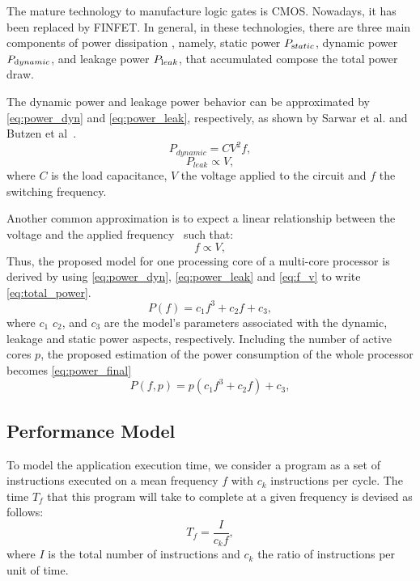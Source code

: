 \documentclass{ieeeaccess}
\begin{document}
The mature technology to manufacture logic gates is CMOS. Nowadays, it has been replaced by FINFET. In general, in these technologies, there are three main components of power dissipation \cite{Rauber2014, Goel2016, Du2017, Gonzalez1997},  namely, static power $P_{\rm static}$, dynamic power $P_{\rm dynamic}$, and leakage power $P_{\rm leak}$, that accumulated compose the total power draw.

The dynamic power and leakage power behavior can be approximated by \cref{eq:power_dyn} and \cref{eq:power_leak}, respectively, as shown by Sarwar et al. and Butzen et al~\cite{Sarwar1997, Butzen2007}.
\begin{equation}
P_{dynamic}=CV^2f,
\label{eq:power_dyn}
\end{equation}
\begin{equation}
P_{leak} \propto V,
\label{eq:power_leak}
\end{equation}
where $C$ is the load capacitance, $V$ the voltage applied to the circuit and $f$ the switching frequency.

Another common approximation is to expect a linear relationship between the voltage and the applied frequency~\cite{Usman2013ANoC} such that:
\begin{equation}
f \propto V,
\label{eq:f_v}
\end{equation}
Thus, the proposed model for one processing core of a multi-core processor is derived by using \cref{eq:power_dyn}, \cref{eq:power_leak} and \cref{eq:f_v} to write \cref{eq:total_power}.
\begin{equation}
P(f)= c_1f^3+c_2f+c_3,
\label{eq:total_power}
\end{equation}
where $c_1$ $c_2$, and $c_3$ are the model's parameters associated with the dynamic, leakage and static power aspects, respectively. Including the number of active cores $p$, the proposed estimation of the power consumption of the whole processor becomes \cref{eq:power_final}
\begin{equation}
P(f,p)= p(c_1f^3+c_2f)+c_3,
\label{eq:power_final}
\end{equation}

\subsection{Performance Model} \label{sec:performancemodel}
To model the application execution time, we consider a program as a set of instructions executed on a mean frequency $f$ with $c_k$ instructions per cycle. The time $T_f$ that this program will take to complete at a given frequency is devised as follows:
\begin{equation}
T_f=\frac{I}{c_kf},
\label{eq:freqrel}
\end{equation}
where $I$ is the total number of instructions and $c_k$ the ratio of instructions per unit of time.
\end{document}

